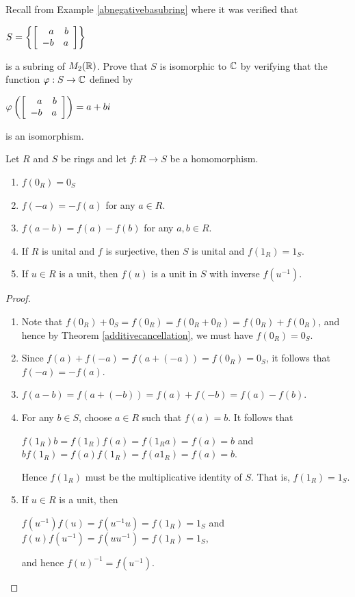 \documentclass[11pt,fleqn,dvipsnames,usenames]{article}
\begin{document}
%
\begin{exercise}
Recall from Example \ref{abnegativebasubring} where it was verified that
\begin{center}
$S = \SET{\MATRIX{rr}{a & b\\-b&a}}$
\end{center}
is a subring of $M_{2}(\REAL)$.  Prove that $S$ is isomorphic to $\COMPLEX$ by verifying that the function $\varphi:S\to\COMPLEX$ defined by
\begin{center}
$\varphi\left(\MATRIX{rr}{a & b\\-b&a}\right) = a + bi$
\end{center}
is an isomorphism.
\end{exercise}
%
\begin{theorem}\label{homomorphismproperties}
Let $R$ and $S$ be rings and let $f:R\to S$ be a homomorphism.
\begin{enumerate}[(1)]
\item $f(0_{R}) = 0_{S}$
\item $f(-a) = -f(a)$ for any $a\in R$.
\item $f(a - b) = f(a) - f(b)$ for any $a,b\in R$.
\item If $R$ is unital and $f$ is surjective, then $S$ is unital and $f(1_{R}) = 1_{S}$.
\item If $u\in R$ is a unit, then $f(u)$ is a unit in $S$ with inverse $f(u^{-1})$.
\end{enumerate}
\end{theorem}
%
\begin{proof}~
\begin{enumerate}[(1)]
\item Note that $f(0_{R}) + 0_{S} = f(0_{R}) = f(0_{R} + 0_{R}) = f(0_{R}) + f(0_{R})$, and hence by Theorem \ref{additivecancellation}, we must have $f(0_{R}) = 0_{S}$.
\item Since $f(a) + f(-a) = f(a + (-a)) = f(0_{R}) = 0_{S}$, it follows that $f(-a) = -f(a)$.
\item $f(a - b) = f(a + (-b)) = f(a) + f(-b) = f(a) - f(b)$.
\item For any $b\in S$, choose $a\in R$ such that $f(a) = b$.  It follows that
\begin{center}
$f(1_{R})b = f(1_{R})f(a) = f(1_{R}a) = f(a) = b$ and $bf(1_{R}) = f(a)f(1_{R}) = f(a1_{R}) = f(a) = b$.
\end{center}
Hence $f(1_{R})$ must be the multiplicative identity of $S$.  That is, $f(1_{R}) = 1_{S}$.
\item If $u\in R$ is a unit, then
\begin{center}
$f(u^{-1})f(u) = f(u^{-1}u) = f(1_{R}) = 1_{S}$ and $f(u)f(u^{-1}) = f(uu^{-1}) = f(1_{R}) = 1_{S}$,
\end{center}
and hence $f(u)^{-1} = f(u^{-1})$.
\end{enumerate}
\end{proof}
\end{document}

